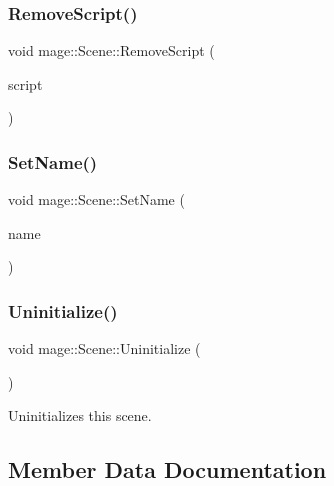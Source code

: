 \hypertarget{classmage_1_1_scene_a82705ba56543dea410439760b1667bc5}{}\label{classmage_1_1_scene_a82705ba56543dea410439760b1667bc5} 
\subsubsection{\texorpdfstring{Remove\+Script()}{RemoveScript()}}
{\footnotesize\ttfamily void mage\+::\+Scene\+::\+Remove\+Script (\begin{DoxyParamCaption}\item[{\hyperlink{namespacemage_a1e01ae66713838a7a67d30e44c67703e}{Shared\+Ptr}$<$ \hyperlink{classmage_1_1_behavior_script}{Behavior\+Script} $>$}]{script }\end{DoxyParamCaption})}

\hypertarget{classmage_1_1_scene_ae5e0a4daa62322ff18d673944ad4e0e8}{}\label{classmage_1_1_scene_ae5e0a4daa62322ff18d673944ad4e0e8} 
\subsubsection{\texorpdfstring{Set\+Name()}{SetName()}}
{\footnotesize\ttfamily void mage\+::\+Scene\+::\+Set\+Name (\begin{DoxyParamCaption}\item[{string}]{name }\end{DoxyParamCaption})\hspace{0.3cm}{\ttfamily [noexcept]}}

\hypertarget{classmage_1_1_scene_a714dc33c04dc2b8e2cec93564905b174}{}\label{classmage_1_1_scene_a714dc33c04dc2b8e2cec93564905b174} 
\subsubsection{\texorpdfstring{Uninitialize()}{Uninitialize()}}
{\footnotesize\ttfamily void mage\+::\+Scene\+::\+Uninitialize (\begin{DoxyParamCaption}{ }\end{DoxyParamCaption})}

Uninitializes this scene. 

\subsection{Member Data Documentation}
\hypertarget{classmage_1_1_scene_a0ce9718f4b0137a52b858a29d3504328}{}\label{classmage_1_1_scene_a0ce9718f4b0137a52b858a29d3504328} 
